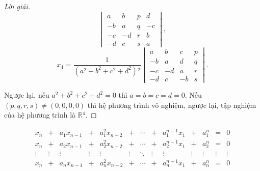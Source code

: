 \documentclass[class=linearalgebra,crop=false]{standalone}
\begin{document}
\begin{proof}[Lời giải]
\[        \begin{vmatrix}
            a  & b  & p & d  \\
            -b & a  & q & -c \\
            -c & -d & r & b  \\
            -d & c  & s & a
        \end{vmatrix},
    \]
    \[
        x_{4} = \dfrac{1}{(a^{2} + b^{2} + c^{2} + d^{2}){}^{2}}
        \begin{vmatrix}
            a  & b  & c  & p \\
            -b & a  & d  & q \\
            -c & -d & a  & r \\
            -d & c  & -b & s
        \end{vmatrix}.
    \]
    \par Ngược lại, nếu $a^{2} + b^{2} + c^{2} + d^{2} = 0$ thì $a = b = c = d = 0$. Nếu $(p, q, r, s) \ne (0, 0, 0, 0)$ thì hệ phương trình vô nghiệm, ngược lại, tập nghiệm của hệ phương trình là $\mathbb{R}{}^{4}$.
\end{proof}

\begin{exercise}
    \[
        \begin{array}{ccccccccccccc}
            x_{n}  & +      & a_{1}x_{n-1} & +      & a_{1}^{2}x_{n-2} & +      & \cdots & +      & a_{1}^{n-1}x_{1} & +      & a_{1}^{n} & =      & 0      \\
            x_{n}  & +      & a_{2}x_{n-1} & +      & a_{2}^{2}x_{n-2} & +      & \cdots & +      & a_{2}^{n-1}x_{1} & +      & a_{2}^{n} & =      & 0      \\
            \vdots & \vdots & \vdots       & \vdots & \vdots           & \vdots & \ddots & \vdots & \vdots           & \vdots & \vdots    & \vdots & \vdots \\
            x_{n}  & +      & a_{n}x_{n-1} & +      & a_{n}^{2}x_{n-2} & +      & \cdots & +      & a_{n}^{n-1}x_{1} & +      & a_{n}^{n} & =      & 0      \\
        \end{array}
    \]
\end{exercise}
\end{document}
